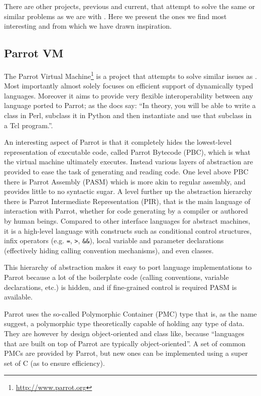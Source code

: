 
There are other projects, previous and current, that attempt to solve the same
or similar problems as we are with \thename{}. Here we present the ones we find
most interesting and from which we have drawn inspiration.

\subsection{Parrot VM}

The Parrot Virtual Machine\footnote{\url{http://www.parrot.org}} is a project
that attempts to solve similar issues as \thename{}. Most importantly almost solely
focuses on efficient support of dynamically typed languages. Moreover it aims to
provide very flexible interoperability between any language ported to Parrot; as
the docs say: ``In theory, you will be able to write a class in Perl, subclass
it in Python and then instantiate and use that subclass in a Tcl
program.''\cite{parrot-docs}.

An interesting aspect of Parrot is that it completely hides the lowest-level
representation of executable code, called Parrot Bytecode (PBC), which is what
the virtual machine ultimately executes. Instead various layers of abstraction
are provided to ease the task of generating and reading code. One level above
PBC there is Parrot Assembly (PASM) which is more akin to regular assembly, and
provides little to no syntactic sugar. A level further up the abstraction
hierarchy there is Parrot Intermediate Representation (PIR), that is the main
language of interaction with Parrot, whether for code generating by a compiler
or authored by human beings. Compared to other interface languages for abstract
machines, it is a high-level language with constructs such as conditional
control structures, infix operators (e.g. \texttt{=}, \texttt{>},
\texttt{\&\&}), local variable and parameter declarations (effectively hiding
calling convention mechanisms), and even classes.

This hierarchy of abstraction makes it easy to port language implementations to
Parrot because a lot of the boilerplate code (calling conventions, variable
declarations, etc.) is hidden, and if fine-grained control is required PASM is
available.

Parrot uses the so-called Polymorphic Container (PMC) type that is, as the name
suggest, a polymorphic type theoretically capable of holding any type of
data. They are however by design object-oriented and class like, because
``languages that are built on top of Parrot are typically
object-oriented''\cite{parrot-docs}. A set of common PMCs are provided by
Parrot, but new ones can be implemented using a super set of C (as to ensure
efficiency).

